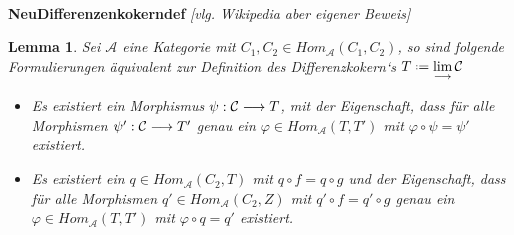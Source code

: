 \documentclass[10pt,a4paper]{report}
\newcounter{Aussage}[chapter]
\newtheorem{lemma}[Aussage]{Lemma}
\newcommand{\functionfront}[3]{\nolinebreak{#1:#2 \longrightarrow #3}}
\newcommand{\colimes}[0]{\lim\limits_{ \longrightarrow }}
\newcommand*{\defeq}{\mathrel{\vcenter{\baselineskip0.5ex \lineskiplimit0pt
                     \hbox{\scriptsize.}\hbox{\scriptsize.}}}%
                     =}
\begin{document}
\ \\
\textbf{NeuDifferenzenkokerndef} \textit{[vlg. Wikipedia aber eigener Beweis]}
\begin{lemma}\label{NeuDifferenzenkokerndef} Sei $\mathcal{A}$ eine Kategorie mit $C_1,C_2 \in Hom_{\mathcal{A}}(C_1,C_2)$, so sind folgende Formulierungen äquivalent zur Definition des Differenzkokern`s $T \defeq \colimes \mathcal{C}$
\begin{itemize}
\item[1.] Es existiert ein Morphismus $\functionfront{\psi}{\mathcal{C}}{T}$, mit der Eigenschaft, dass für alle Morphismen $\functionfront{\psi '}{\mathcal{C}}{T'}$ genau ein $\varphi \in Hom_{\mathcal{A}}(T,T')$ mit $\varphi \circ \psi = \psi '$ existiert.
\item[2.] Es existiert ein $q \in Hom_{\mathcal{A}}(C_2,T)$ mit $q \circ f = q \circ g$ und der Eigenschaft, dass für alle Morphismen $q' \in Hom_{\mathcal{A}}(C_2,Z)$ mit $q' \circ f = q' \circ g$ genau ein $\varphi \in Hom_{\mathcal{A}}(T,T')$ mit $\varphi \circ q = q'$ existiert.
\begin{center}
\end{center}
\end{itemize}
\end{lemma}
\end{document}
